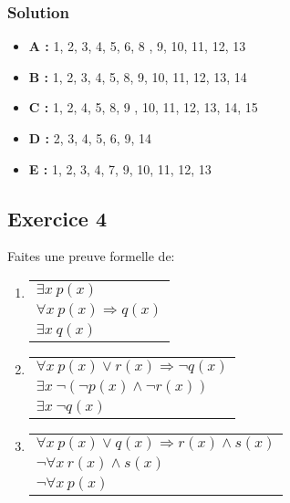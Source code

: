 {    \subsubsection*{Solution}

    \begin{itemize}
        \item \textbf{A :} 1, 2, 3, 4, 5, 6, 8 , 9, 10, 11, 12, 13
        \item \textbf{B :} 1, 2, 3, 4, 5, 8, 9, 10, 11, 12, 13, 14
        \item \textbf{C :} 1, 2, 4, 5, 8, 9 , 10, 11, 12, 13, 14, 15
        \item \textbf{D :} 2, 3, 4, 5, 6, 9, 14
        \item \textbf{E :} 1, 2, 3, 4, 7, 9, 10, 11, 12, 13
    \end{itemize}

\subsection*{Exercice 4}
Faites une preuve formelle de:

\begin{enumerate}

	\item \enter
\begin{flushleft}
\begin{tabular}{l}
$\exists x \ p(x)$ \\
$\forall x \ p(x) \Rightarrow q(x)$ \\
\hline
$\exists x \ q(x)$
\end{tabular}
\end{flushleft}

	\item \enter
\begin{flushleft}
\begin{tabular}{l}
$\forall x \ p(x) \vee r(x) \Rightarrow \neg q(x)$ \\
$\exists x \ \neg (\neg p(x) \land \neg r(x))$ \\
\hline
$\exists x \ \neg q(x)$
\end{tabular}
\end{flushleft}

	\item \enter
\begin{flushleft}
\begin{tabular}{l}
$\forall x \ p(x) \vee q(x) \Rightarrow r(x) \land s(x)$ \\
$\neg \forall x \ r(x) \land s(x)$ \\
\hline
$\neg \forall x \ p(x)$
\end{tabular}
\end{flushleft}


\end{enumerate}}
